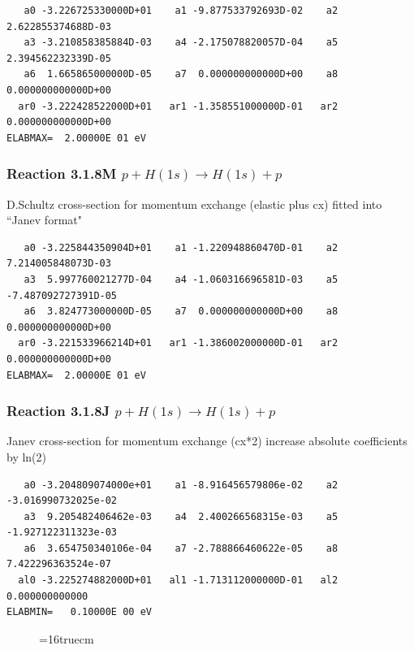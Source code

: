 \documentclass[12pt,dvips]{article}
\begin{document}
\begin{small}\begin{verbatim}
   a0 -3.226725330000D+01    a1 -9.877533792693D-02    a2  2.622855374688D-03
   a3 -3.210858385884D-03    a4 -2.175078820057D-04    a5  2.394562232339D-05
   a6  1.665865000000D-05    a7  0.000000000000D+00    a8  0.000000000000D+00
  ar0 -3.222428522000D+01   ar1 -1.358551000000D-01   ar2  0.000000000000D+00
ELABMAX=  2.00000E 01 eV
\end{verbatim}\end{small}

\subsubsection{
Reaction 3.1.8M $  p + H(1s) \rightarrow H(1s) + p  $
}
D.Schultz cross-section for momentum exchange (elastic plus cx)
fitted into ``Janev format"

\begin{small}\begin{verbatim}
   a0 -3.225844350904D+01    a1 -1.220948860470D-01    a2  7.214005848073D-03
   a3  5.997760021277D-04    a4 -1.060316696581D-03    a5 -7.487092727391D-05
   a6  3.824773000000D-05    a7  0.000000000000D+00    a8  0.000000000000D+00
  ar0 -3.221533966214D+01   ar1 -1.386002000000D-01   ar2  0.000000000000D+00
ELABMAX=  2.00000E 01 eV
\end{verbatim}\end{small}
\subsubsection{
Reaction 3.1.8J $  p + H(1s) \rightarrow H(1s) + p  $
}
Janev cross-section for momentum exchange (cx*2)
increase absolute coefficients by ln(2)

\begin{small}\begin{verbatim}
   a0 -3.204809074000e+01    a1 -8.916456579806e-02    a2 -3.016990732025e-02
   a3  9.205482406462e-03    a4  2.400266568315e-03    a5 -1.927122311323e-03
   a6  3.654750340106e-04    a7 -2.788866460622e-05    a8  7.422296363524e-07
  al0 -3.225274882000D+01   al1 -1.713112000000D-01   al2  0.000000000000
ELABMIN=   0.10000E 00 eV
\end{verbatim}\end{small}

\begin{figure} \label{318RS}
\epsfxsize=16truecm
\end{figure}
\newpage
\end{document}
